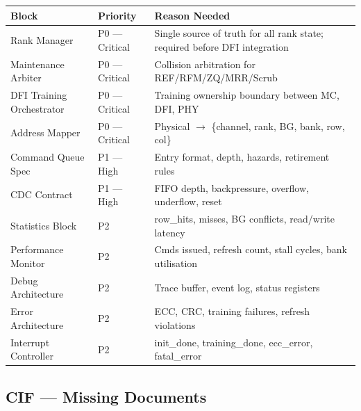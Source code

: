 \documentclass[10pt,a4paper]{article}
\newcommand{\Th}[1]{\cellcolor{thbg}\textbf{\small\color{acc1}#1}}
\newcommand{\RB}{\rowcolor{altbg}}
\newcommand{\RC}{\rowcolor{acc2lt}}
\begin{document}
\begin{center}
\begin{tabularx}{\linewidth}{@{} l l X @{}}
\toprule
\Th{Block} & \Th{Priority} & \Th{Reason Needed} \\
\midrule
\RC Rank Manager         & P0 --- Critical & Single source of truth for all rank state; required before DFI integration \\
\RC Maintenance Arbiter  & P0 --- Critical & Collision arbitration for REF/RFM/ZQ/MRR/Scrub \\
\RC DFI Training Orchestrator & P0 --- Critical & Training ownership boundary between MC, DFI, PHY \\
\RC Address Mapper       & P0 --- Critical & Physical $\to$ \{channel, rank, BG, bank, row, col\} \\
\RB Command Queue Spec   & P1 --- High & Entry format, depth, hazards, retirement rules \\
\RB CDC Contract         & P1 --- High & FIFO depth, backpressure, overflow, underflow, reset \\
\RB Statistics Block     & P2 & row\_hits, misses, BG conflicts, read/write latency \\
\RB Performance Monitor  & P2 & Cmds issued, refresh count, stall cycles, bank utilisation \\
\RB Debug Architecture   & P2 & Trace buffer, event log, status registers \\
\RB Error Architecture   & P2 & ECC, CRC, training failures, refresh violations \\
\RB Interrupt Controller & P2 & init\_done, training\_done, ecc\_error, fatal\_error \\
\bottomrule
\end{tabularx}
\end{center}

\subsection{CIF --- Missing Documents}
\end{document}

